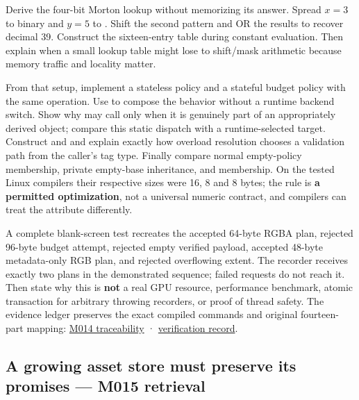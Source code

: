 Derive the four-bit Morton lookup without memorizing its answer. Spread \(x=3\) to binary  and \(y=5\) to . Shift the second pattern and OR the results to recover decimal 39. Construct the sixteen-entry table during constant evaluation. Then explain when a small lookup table might lose to shift/mask arithmetic because memory traffic and locality matter.

From that setup, implement a stateless policy and a stateful budget policy with the same  operation. Use  to compose the behavior without a runtime backend switch. Show why  may call  only when it is genuinely part of an appropriately derived object; compare this static dispatch with a runtime-selected  target. Construct  and  and explain exactly how overload resolution chooses a validation path from the caller's tag type. Finally compare normal empty-policy membership, private empty-base inheritance, and  membership. On the tested Linux compilers their respective sizes were 16, 8 and 8 bytes; the rule is \textbf{a permitted optimization}, not a universal numeric contract, and compilers can treat the attribute differently.

A complete blank-screen test recreates the accepted 64-byte RGBA plan, rejected 96-byte budget attempt, rejected empty verified payload, accepted 48-byte metadata-only RGB plan, and rejected overflowing extent. The recorder receives exactly two plans in the demonstrated sequence; failed requests do not reach it. Then state why this is \textbf{not} a real GPU resource, performance benchmark, atomic transaction for arbitrary throwing recorders, or proof of thread safety. The evidence ledger preserves the exact compiled commands and original fourteen-part mapping: \hyperref[appendix-fd090d982a15-m014-parts-217230-one-tile-planner-and-its-compile-time-policy-decisions]{M014 traceability} · \hyperref[appendix-a103e7846d21-phase-4-additive-reconstruction-m014-parts-217230]{verification record}.

\subsection{A growing asset store must preserve its promises --- M015 retrieval}\label{appendix-960160274237-a-growing-asset-store-must-preserve-its-promises-m015-retrieval}

